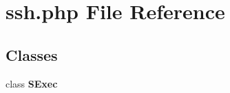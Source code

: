 \section{ssh.php File Reference}
\label{ssh_8php}
\subsection*{Classes}
\begin{CompactItemize}
\item 
class {\bf SExec}
\end{CompactItemize}
